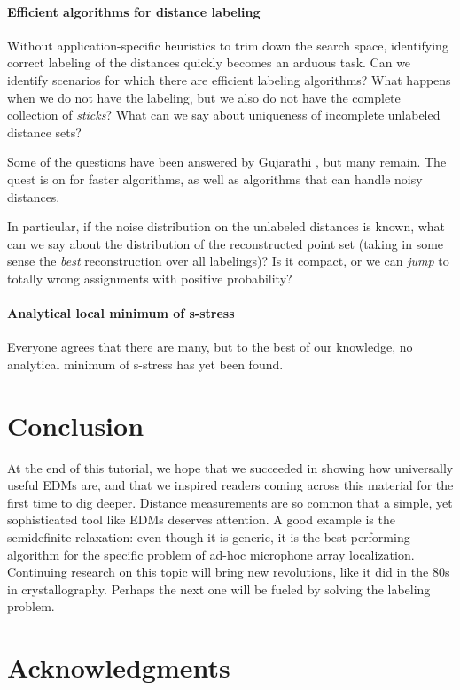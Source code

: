 \documentclass[10pt,double]{IEEEtran}
\newcommand{\rev}[1]{{#1}}
\begin{document}
\paragraph{Efficient algorithms for distance labeling} Without
application-specific heuristics to trim down the search space, identifying
correct labeling of the distances quickly becomes an arduous task. Can we
identify scenarios for which there are efficient labeling algorithms? What
happens when we do not have the labeling, but we also do not have the complete
collection of \emph{sticks}? What can we say about uniqueness of incomplete
unlabeled distance sets? \rev{Some of the questions have been answered by
Gujarathi \cite{Gujarathi:2014cz}, but many remain. The quest is on for faster
algorithms, as well as algorithms that can handle noisy distances.

In particular, if the noise distribution on the unlabeled distances is known,
what can we say about the distribution of the reconstructed point set (taking
in some sense the \emph{best} reconstruction over all labelings)? Is it
compact, or we can \emph{jump} to totally wrong assignments with positive
probability?}


\paragraph{Analytical local minimum of s-stress} Everyone agrees that there
are many, but to the best of our knowledge, no analytical minimum of s-stress
has yet been found.



\section{Conclusion}

At the end of this tutorial, we hope that we succeeded in showing how
universally useful EDMs are, and that we inspired readers coming across this
material for the first time to dig deeper. Distance measurements are so common
that a simple, yet sophisticated tool like EDMs deserves attention. A good
example is the semidefinite relaxation: even though it is generic, it is the
best performing algorithm for the specific problem of ad-hoc microphone array
localization. Continuing research on this topic will bring new revolutions,
like it did in the 80s in crystallography. Perhaps the next one will be fueled
by solving the labeling problem.

\section*{Acknowledgments}
\end{document}

